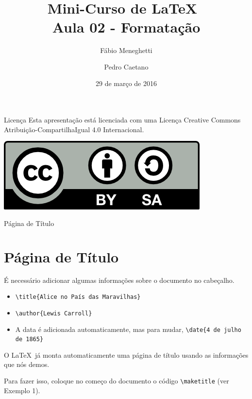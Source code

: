 \documentclass[12pt]{beamer}
\title{Mini-Curso de \LaTeX\ \\ Aula 02 - Formatação}
\author{Fábio Meneghetti \and Pedro Caetano}
\date{29 de março de 2016}
\begin{document}
\begin{frame}
  \titlepage
\end{frame}

\begin{frame}{Licença}
  Esta apresentação está licenciada com uma Licença Creative Commons Atribuição-CompartilhaIgual 4.0 Internacional.
  \begin{center}
    \includegraphics[scale=0.3]{../license.png}
  \end{center}
\end{frame}

\begin{frame}
  \tableofcontents
\end{frame}

\begin{frame}[fragile]{Página de Título}
  \section{Página de Título}

  É necessário adicionar algumas informações sobre o documento no cabeçalho.
  \begin{itemize}
    \item \verb+\title{Alice no País das Maravilhas}+
    \item \verb+\author{Lewis Carroll}+
    \item A data é adicionada automaticamente, mas para mudar, \verb+\date{4 de julho de 1865}+
  \end{itemize}

\end{frame}

\begin{frame}[fragile]
  O \LaTeX\ já monta automaticamente uma página de título usando as informações que nós demos.

  Para fazer isso, coloque no começo do documento o código \verb+\maketitle+ (ver Exemplo 1).
\end{frame}
\end{document}

